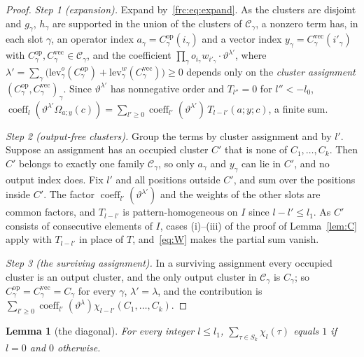 \documentclass[11pt]{amsart}
\newtheorem{lemma}[theorem]{Lemma}
\theoremstyle{definition}
\theoremstyle{remark}
\numberwithin{equation}{section}
\newcommand{\cC}{\mathcal{C}}
\newcommand{\coeff}{\operatorname{coeff}}
\newcommand{\Cop}{C^{\mathrm{op}}}
\newcommand{\Cvec}{C^{\mathrm{vec}}}
\theoremstyle{plain}
\theoremstyle{definition}
\theoremstyle{plain}
\begin{document}
\begin{proof}
\emph{Step 1 (expansion).} Expand by~\eqref{frc:eq:expand}. As the clusters are disjoint and $g_\gamma$, $h_\gamma$ are
supported in the union of the clusters of $\cC_\gamma$, a nonzero term has, in each slot $\gamma$, an operator index
$a_\gamma=\Cop_\gamma(i_\gamma)$ and a vector index $y_\gamma=\Cvec_\gamma(i'_\gamma)$ with
$\Cop_\gamma,\Cvec_\gamma\in\cC_\gamma$, and the coefficient $\prod_\gamma o_{i_\gamma}w_{i'_\gamma}\cdot\vartheta^{\lambda'}$,
where $\lambda'=\sum_\gamma\bigl(\mathrm{lev}^o_\gamma(\Cop_\gamma)+\mathrm{lev}^w_\gamma(\Cvec_\gamma)\bigr)\ge0$ depends
only on the \emph{cluster assignment} $(\Cop_\gamma,\Cvec_\gamma)_\gamma$. Since $\vartheta^{\lambda'}$ has nonnegative
order and $T_{l''}=0$ for $l''<-l_0$,
$\coeff_l(\vartheta^{\lambda'}\Omega_{a;y}(c))=\sum_{l'\ge0}\coeff_{l'}(\vartheta^{\lambda'})\,T_{l-l'}(a;y;c)$, a finite
sum.

\emph{Step 2 (output-free clusters).} Group the terms by cluster assignment and by $l'$. Suppose an assignment has an
occupied cluster $C'$ that is none of $C_1,\dots,C_k$. Then $C'$ belongs to exactly one family $\cC_\gamma$, so only
$a_\gamma$ and $y_\gamma$ can lie in $C'$, and no output index does. Fix $l'$ and all positions outside $C'$, and sum over
the positions inside $C'$. The factor $\coeff_{l'}(\vartheta^{\lambda'})$ and the weights of the other slots are common
factors, and $T_{l-l'}$ is pattern-homogeneous on $I$ since $l-l'\le l_1$. As $C'$ consists of consecutive elements of $I$,
cases (i)--(iii) of the proof of Lemma~\ref{lem:C} apply with $T_{l-l'}$ in place of $T$, and~\eqref{eq:W} makes the
partial sum vanish.

\emph{Step 3 (the surviving assignment).} In a surviving assignment every occupied cluster is an output cluster, and the
only output cluster in $\cC_\gamma$ is $C_\gamma$; so $\Cop_\gamma=\Cvec_\gamma=C_\gamma$ for every $\gamma$,
$\lambda'=\lambda$, and the contribution is $\sum_{l'\ge0}\coeff_{l'}(\vartheta^\lambda)\chi_{l-l'}(C_1,\dots,C_k)$.
\end{proof}

\begin{lemma}[the diagonal]\label{frc:lem:diagonal}
For every integer $l\le l_1$, $\sum_{\tau\in S_k}\chi_l(\tau)$ equals $1$ if $l=0$ and $0$ otherwise.
\end{lemma}
\end{document}
